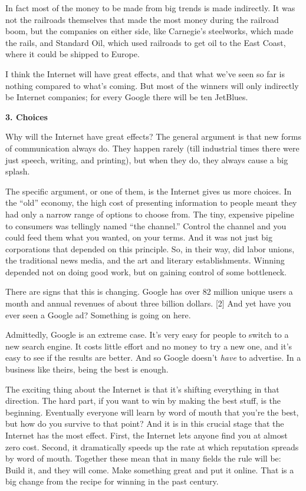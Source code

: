 In fact most of the money to be made from big trends is made indirectly.
It was not the railroads themselves that made the most money during the
railroad boom, but the companies on either side, like Carnegie's
steelworks, which made the rails, and Standard Oil, which used railroads
to get oil to the East Coast, where it could be shipped to Europe.

I think the Internet will have great effects, and that what we've seen
so far is nothing compared to what's coming. But most of the winners
will only indirectly be Internet companies; for every Google there will
be ten JetBlues.

\textbf{3. Choices}

Why will the Internet have great effects? The general argument is that
new forms of communication always do. They happen rarely (till
industrial times there were just speech, writing, and printing), but
when they do, they always cause a big splash.

The specific argument, or one of them, is the Internet gives us more
choices. In the ``old'' economy, the high cost of presenting information
to people meant they had only a narrow range of options to choose from.
The tiny, expensive pipeline to consumers was tellingly named ``the
channel.'' Control the channel and you could feed them what you wanted,
on your terms. And it was not just big corporations that depended on
this principle. So, in their way, did labor unions, the traditional news
media, and the art and literary establishments. Winning depended not on
doing good work, but on gaining control of some bottleneck.

There are signs that this is changing. Google has over 82 million unique
users a month and annual revenues of about three billion dollars.
{[}2{]} And yet have you ever seen a Google ad? Something is going on
here.

Admittedly, Google is an extreme case. It's very easy for people to
switch to a new search engine. It costs little effort and no money to
try a new one, and it's easy to see if the results are better. And so
Google doesn't \emph{have} to advertise. In a business like theirs,
being the best is enough.

The exciting thing about the Internet is that it's shifting everything
in that direction. The hard part, if you want to win by making the best
stuff, is the beginning. Eventually everyone will learn by word of mouth
that you're the best, but how do you survive to that point? And it is in
this crucial stage that the Internet has the most effect. First, the
Internet lets anyone find you at almost zero cost. Second, it
dramatically speeds up the rate at which reputation spreads by word of
mouth. Together these mean that in many fields the rule will be: Build
it, and they will come. Make something great and put it online. That is
a big change from the recipe for winning in the past century.


